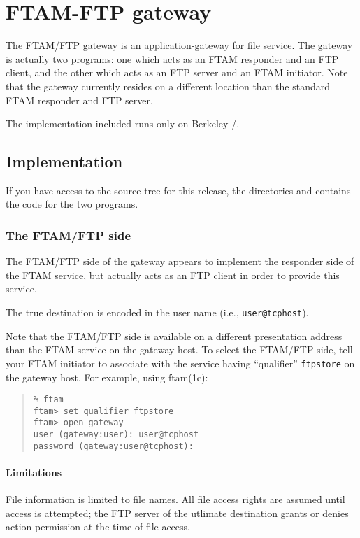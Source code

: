 
\chapter	{FTAM-FTP gateway}\label{ftamftp}
The FTAM/FTP gateway is an application-gateway for file service.
The gateway is actually two programs:
one which acts as an FTAM responder and an FTP client,
and the other which acts as an FTP server and an FTAM initiator.
Note that the gateway currently resides on a different location than the
standard FTAM responder and FTP server.

The implementation included runs only on Berkeley \unix/.

\section	{Implementation}\label{ftamftp:code}
If you have access to the source tree for this release,
the directories  and 
contains the code for the two programs.

\subsection	{The FTAM/FTP side}
The FTAM/FTP side of the gateway appears to implement the responder side of
the FTAM service,
but actually acts as an FTP client in order to provide this service.

The true destination is encoded in the user name (i.e., \verb"user@tcphost").

Note that the FTAM/FTP side is available on a different presentation address
than the FTAM service on the gateway host.
To select the FTAM/FTP side,
tell your FTAM initiator to associate with the service having ``qualifier''
\verb"ftpstore" on the gateway host.
For example, using \man ftam(1c):
\begin{quote}\small\begin{verbatim}
% ftam
ftam> set qualifier ftpstore
ftam> open gateway
user (gateway:user): user@tcphost
password (gateway:user@tcphost): 
\end{verbatim}\end{quote}

\subsubsection	{Limitations}
File information is limited to file names.
All file access rights are assumed until access is attempted;
the FTP server of the utlimate destination grants or denies action permission
at the time of file access.

